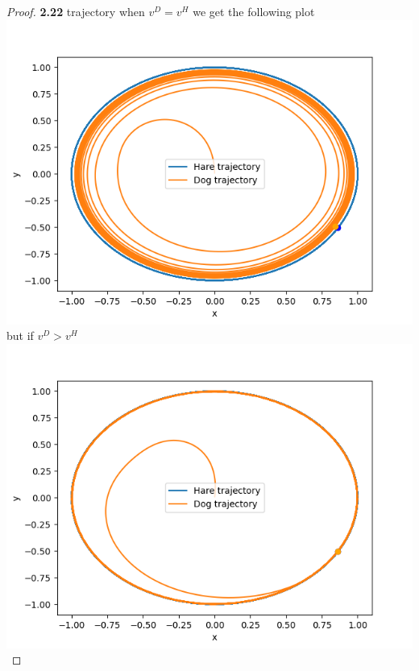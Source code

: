 \documentclass[11pt]{article}
\begin{document}
\begin{proof}{\textbf{2.22}}
        trajectory
        when $v^D = v^H$ we get the following plot\\
        \includegraphics{gregory-2.22-2_vd=vh.png}
\cleardoublepage
        but if $v^D > v^H$\\
        \includegraphics{gregory-2.22-2_vd>vh.png}
          
    \end{proof}
\end{document}
